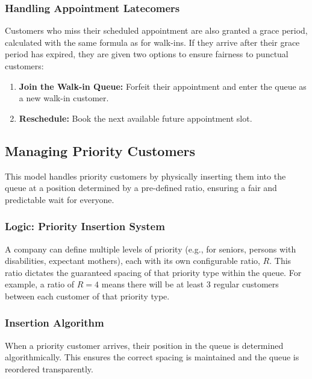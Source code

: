 \documentclass{article}
\begin{document}
\subsubsection{Handling Appointment Latecomers}
Customers who miss their scheduled appointment are also granted a grace period, calculated with the same formula as for walk-ins. If they arrive after their grace period has expired, they are given two options to ensure fairness to punctual customers:
\begin{enumerate}
    \item \textbf{Join the Walk-in Queue:} Forfeit their appointment and enter the queue as a new walk-in customer.
    \item \textbf{Reschedule:} Book the next available future appointment slot.
\end{enumerate}

\subsection{Managing Priority Customers}
This model handles priority customers by physically inserting them into the queue at a position determined by a pre-defined ratio, ensuring a fair and predictable wait for everyone.

\subsubsection{Logic: Priority Insertion System}
A company can define multiple levels of priority (e.g., for seniors, persons with disabilities, expectant mothers), each with its own configurable ratio, $R$. This ratio dictates the guaranteed spacing of that priority type within the queue. For example, a ratio of $R=4$ means there will be at least 3 regular customers between each customer of that priority type.

\subsubsection{Insertion Algorithm}
When a priority customer arrives, their position in the queue is determined algorithmically. This ensures the correct spacing is maintained and the queue is reordered transparently.
\end{document}

